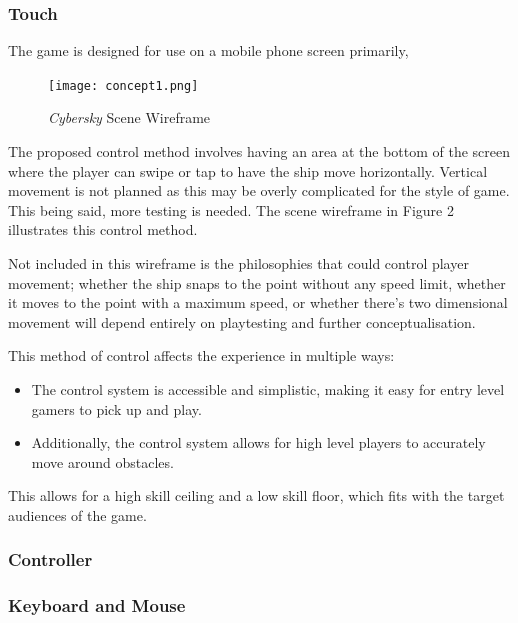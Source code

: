 \documentclass{scrartcl}
\begin{document}
\subsubsection{Touch}

The game is designed for use on a mobile phone screen primarily,

\begin{figure}[!ht]
  \centering
  \texttt{[image: concept1.png]}
  \caption[\textit{Cybersky}]{\textit{Cybersky} Scene Wireframe}
\end{figure}

The proposed control method involves having an area at the bottom of the screen where the player can swipe or tap to have the ship move horizontally. Vertical movement is not planned as this may be overly complicated for the style of game. This being said, more testing is needed. The scene wireframe in Figure 2 illustrates this control method.

Not included in this wireframe is the philosophies that could control player movement; whether the ship snaps to the point without any speed limit, whether it moves to the point with a maximum speed, or whether there's two dimensional movement will depend entirely on playtesting and further conceptualisation.

This method of control affects the experience in multiple ways:

\begin{itemize}
  \item The control system is accessible and simplistic, making it easy for entry level gamers to pick up and play.
  \item Additionally, the control system allows for high level players to accurately move around obstacles.
\end{itemize}

This allows for a high skill ceiling and a low skill floor, which fits with the target audiences of the game.

\subsubsection{Controller}

\subsubsection{Keyboard and Mouse}

\printbibliography
\end{document}
